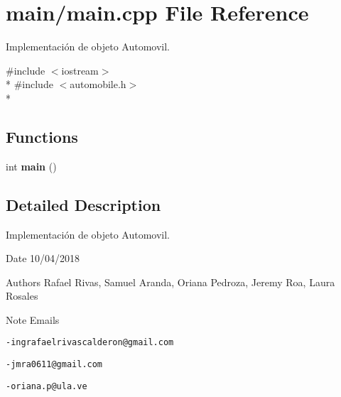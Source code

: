 \section{main/main.cpp File Reference}
\label{main_8cpp}


Implementación de objeto Automovil.  


{\ttfamily \#include $<$iostream$>$}\\*
{\ttfamily \#include $<$automobile.\+h$>$}\\*
\subsection*{Functions}
\begin{DoxyCompactItemize}
\item 
int {\bfseries main} ()\label{main_8cpp_ae66f6b31b5ad750f1fe042a706a4e3d4}

\end{DoxyCompactItemize}


\subsection{Detailed Description}
Implementación de objeto Automovil. 

\begin{DoxyDate}{Date}
10/04/2018 
\end{DoxyDate}
\begin{DoxyAuthor}{Authors}
Rafael Rivas, Samuel Aranda, Oriana Pedroza, Jeremy Roa, Laura Rosales 
\end{DoxyAuthor}
\begin{DoxyNote}{Note}
Emails 

{\tt -\/ingrafaelrivascalderon@gmail.\+com} 

{\tt -\/jmra0611@gmail.\+com} 

{\tt -\/oriana.\+p@ula.\+ve} 
\end{DoxyNote}
